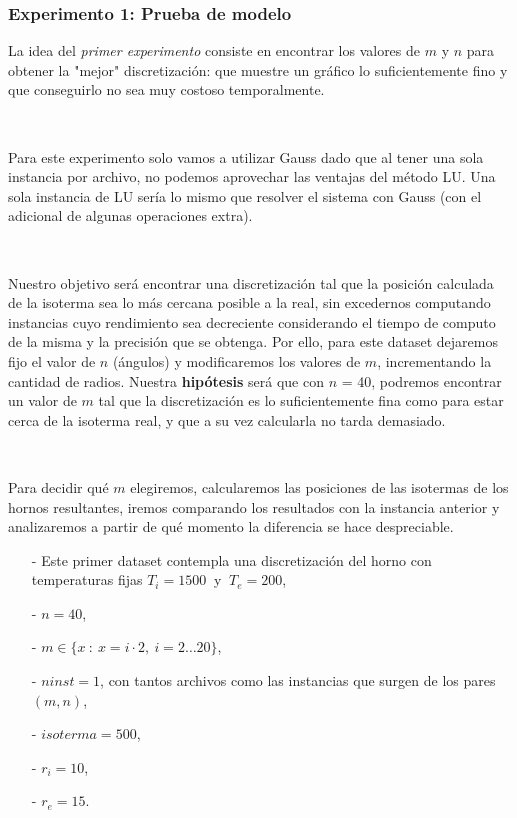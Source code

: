 \newpage

\subsubsection{Experimento 1: Prueba de modelo}

La idea del \emph{primer experimento} consiste en encontrar los valores de $m$ y $n$ para obtener la "mejor" discretización: que muestre un gráfico lo suficientemente fino y que conseguirlo no sea muy costoso temporalmente.  

\

Para este experimento solo vamos a utilizar Gauss dado que al tener una sola instancia por archivo, no podemos aprovechar las ventajas del método LU. Una sola instancia de LU sería lo mismo que resolver el sistema con Gauss (con el adicional de algunas operaciones extra). 

\

Nuestro objetivo será encontrar una discretización tal que la posición calculada de la isoterma sea lo más cercana posible a la real, sin excedernos computando instancias cuyo rendimiento sea decreciente considerando el tiempo de computo de la misma y la precisión que se obtenga. Por ello, para este dataset dejaremos fijo el valor de $n$ (ángulos) y modificaremos los valores de $m$, incrementando la cantidad de radios. Nuestra \textbf{hipótesis} será que con $n$ = 40, podremos encontrar un valor de $m$ tal que  la discretización es lo suficientemente fina como para estar cerca de la isoterma real, y que a su vez calcularla no tarda demasiado. 

\

Para decidir qué $m$ elegiremos, calcularemos las posiciones de las isotermas de los hornos resultantes, iremos comparando los resultados con la instancia anterior y analizaremos a partir de qué momento la diferencia se hace despreciable.  


\begin{itemize}
    \item[-] Este primer dataset contempla una discretización del horno con temperaturas fijas $T_i = 1500~$ y $~T_e = 200$,
    \item[-] $n = 40$,
    \item[-] $m \in \{x~:~x = i\cdot 2, ~ i = 2\ldots20\}$,
    \item[-] $ninst = 1$, con tantos archivos como las instancias que surgen de los pares $(m,n)$,
    \item[-] $isoterma = 500$, 
    \item[-] $r_i = 10$,
    \item[-] $r_e = 15$.
\end{itemize}

